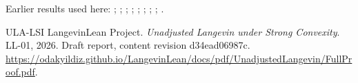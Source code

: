 \documentclass[11pt,a4paper]{article}
\begin{document}
Earlier results used here: \cite[Section~3.13.2]{LangevinLean2026ULASC}; \cite[Section~3.13.3]{LangevinLean2026ULASC}; \cite[Section~3.25.1]{LangevinLean2026ULASC}; \cite[Section~3.25.3]{LangevinLean2026ULASC}; \cite[Section~3.26.10]{LangevinLean2026ULASC}; \cite[Section~3.26.13]{LangevinLean2026ULASC}; \cite[Section~3.26.3]{LangevinLean2026ULASC}; \cite[Section~3.29.7]{LangevinLean2026ULASC}; \cite[Section~3.46.2]{LangevinLean2026ULASC}.

\begin{thebibliography}{ULA-LSI}
LangevinLean Project. \emph{Unadjusted Langevin under Strong Convexity}. LL-01, 2026. Draft report, content revision d34ead06987c. \url{https://odakyildiz.github.io/LangevinLean/docs/pdf/UnadjustedLangevin/FullProof.pdf}.
\end{thebibliography}
\end{document}
